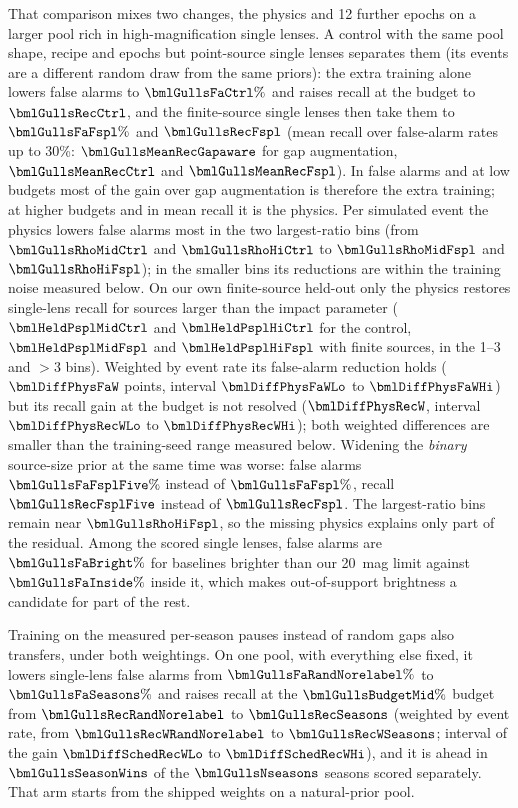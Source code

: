 That comparison mixes two changes, the physics and 12 further epochs on a larger pool rich in
high-magnification single lenses. A control with the same pool shape, recipe and epochs but point-source
single lenses separates them (its events are a different random draw from the same priors): the extra
training alone lowers false alarms to $\bmlGullsFaCtrl\%$ and raises recall at the budget to
$\bmlGullsRecCtrl$, and the finite-source single lenses then take them to $\bmlGullsFaFspl\%$ and
$\bmlGullsRecFspl$ (mean recall over false-alarm rates up to 30\%: $\bmlGullsMeanRecGapaware$ for gap
augmentation, $\bmlGullsMeanRecCtrl$ and $\bmlGullsMeanRecFspl$). In false alarms and at low budgets most of
the gain over gap augmentation is therefore the extra training; at higher budgets and in mean recall it is
the physics. Per simulated event the physics lowers false alarms most in the two largest-ratio bins (from
$\bmlGullsRhoMidCtrl$ and $\bmlGullsRhoHiCtrl$ to $\bmlGullsRhoMidFspl$ and $\bmlGullsRhoHiFspl$); in the smaller
bins its reductions are within the training noise measured below. On our
own finite-source held-out only the physics restores single-lens recall for sources larger than the
impact parameter ($\bmlHeldPsplMidCtrl$ and $\bmlHeldPsplHiCtrl$ for the control, $\bmlHeldPsplMidFspl$
and $\bmlHeldPsplHiFspl$ with finite sources, in the 1--3 and $> 3$ bins). Weighted by event rate its
false-alarm reduction holds ($\bmlDiffPhysFaW$ points, interval $\bmlDiffPhysFaWLo$ to
$\bmlDiffPhysFaWHi$) but its recall gain at the budget is not resolved ($\bmlDiffPhysRecW$, interval
$\bmlDiffPhysRecWLo$ to $\bmlDiffPhysRecWHi$); both weighted differences are smaller than the training-seed
range measured below. Widening the \emph{binary} source-size prior at the same
time was worse: false alarms $\bmlGullsFaFsplFive\%$ instead of $\bmlGullsFaFspl\%$, recall
$\bmlGullsRecFsplFive$ instead of $\bmlGullsRecFspl$. The largest-ratio bins remain near
$\bmlGullsRhoHiFspl$, so the missing physics explains only part of the residual. Among the scored single
lenses, false alarms are $\bmlGullsFaBright\%$ for baselines brighter than our 20~mag limit against
$\bmlGullsFaInside\%$ inside it, which makes out-of-support brightness a candidate for part of the rest.

Training on the measured per-season pauses instead of random gaps also transfers, under both weightings.
On one pool, with everything else fixed, it lowers single-lens false alarms from
$\bmlGullsFaRandNorelabel\%$ to $\bmlGullsFaSeasons\%$ and raises recall at the $\bmlGullsBudgetMid\%$
budget from $\bmlGullsRecRandNorelabel$ to $\bmlGullsRecSeasons$ (weighted by event rate, from
$\bmlGullsRecWRandNorelabel$ to $\bmlGullsRecWSeasons$; interval of the gain $\bmlDiffSchedRecWLo$ to
$\bmlDiffSchedRecWHi$), and it is ahead in $\bmlGullsSeasonWins$ of the $\bmlGullsNseasons$ seasons
scored separately. That arm starts from the shipped weights on a natural-prior pool.

